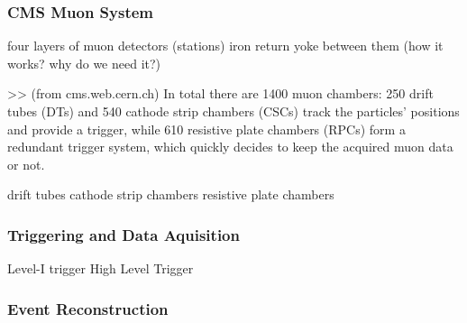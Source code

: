 \subsubsection{CMS Muon System}
four layers of muon detectors (stations)
iron return yoke between them (how it works? why do we need it?)

>> (from cms.web.cern.ch) In total there are 1400 muon chambers: 250 drift tubes (DTs) and 540 cathode strip chambers (CSCs) track the particles’ positions and provide a trigger, while 610 resistive plate chambers (RPCs) form a redundant trigger system, which quickly decides to keep the acquired muon data or not. 

drift tubes
cathode strip chambers
resistive plate chambers

\subsubsection{Triggering and Data Aquisition}
Level-I trigger
High Level Trigger

\subsubsection{Event Reconstruction}

